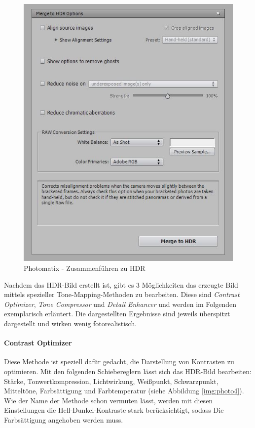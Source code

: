 \documentclass[liststotoc,bibtotoc,fontsize=14pt,]{scrreprt}
\begin{document}
		\bigskip
		\begin{figure}[H]
			\includegraphics[width=0.8\linewidth]{img/photo2.jpg}
			\caption{Photomatix - Zusammenführen zu HDR}
			\label{img:photo2}
		\end{figure}
	
		Nachdem das HDR-Bild erstellt ist, gibt es 3 Möglichkeiten das erzeugte Bild mittels spezieller Tone-Mapping-Methoden zu bearbeiten. Diese sind \textit{Contrast Optimizer}, \textit{Tone Compressor} und \textit{Detail Enhancer} und werden im Folgenden exemplarisch erläutert. Die dargestellten Ergebnisse sind jeweils überspitzt dargestellt und wirken wenig fotorealistisch.
		
		\bigskip
		\paragraph{Contrast Optimizer} Diese Methode ist speziell dafür gedacht, die Darstellung von Kontrasten zu optimieren. Mit den folgenden Schiebereglern lässt sich das HDR-Bild bearbeiten: Stärke, Tonwertkompression,	Lichtwirkung, Weißpunkt, Schwarzpunkt, Mitteltöne, Farbsättigung und Farbtemperatur (siehe Abbildung \ref{img:photo4}). Wie der Name der Methode schon vermuten lässt, werden mit diesen Einstellungen die Hell-Dunkel-Kontraste stark berücksichtigt, sodass Die Farbsättigung angehoben werden muss.
		
\end{document}
